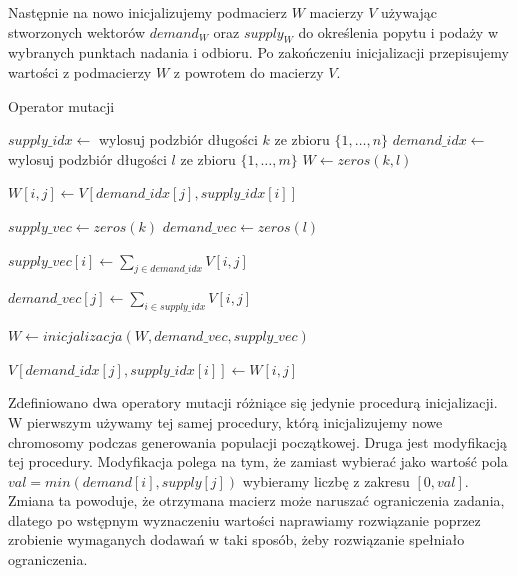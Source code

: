 Następnie na nowo inicjalizujemy podmacierz $W$ macierzy $V$ używając stworzonych wektorów $demand_W$ oraz $supply_W$ do określenia popytu i podaży
w wybranych punktach nadania i odbioru. Po zakończeniu inicjalizacji przepisujemy wartości z podmacierzy $W$ z powrotem do macierzy $V$.

\begin{pseudokod}
    \caption{Operator mutacji}
    
    $supply\_idx \gets$ wylosuj podzbiór długości $k$ ze zbioru $\{1, \dots, n\}$\;
    $demand\_idx \gets$ wylosuj podzbiór długości $l$ ze zbioru $\{1, \dots, m\}$\;
    $W \gets zeros(k, l)$

     {
         {
            $W[i, j] \gets V[demand\_idx[j], supply\_idx[i]]$\;
        }
    }
    
    $supply\_vec \gets zeros(k)$
    $demand\_vec \gets zeros(l)$
    
     {
        $supply\_vec[i] \gets \sum_{j \in demand\_idx} V[i, j]$\;
    }
        
     {
        $demand\_vec[j] \gets \sum_{i \in supply\_idx} V[i, j]$\;
    }
    
    $W \gets inicjalizacja(W, demand\_vec, supply\_vec)$\;
    
     {
         {
            $V[demand\_idx[j], supply\_idx[i]] \gets W[i, j]$\;
        }
    }
    
\end{pseudokod}

Zdefiniowano dwa operatory mutacji różniące się jedynie procedurą inicjalizacji. W pierwszym używamy tej samej procedury, którą inicjalizujemy 
nowe chromosomy podczas generowania populacji początkowej. Druga jest modyfikacją tej procedury. Modyfikacja polega na tym, że zamiast wybierać 
jako wartość pola $val = min(demand[i], supply[j])$ wybieramy liczbę z zakresu $[0, val]$. Zmiana ta powoduje, że otrzymana macierz może naruszać 
ograniczenia zadania, dlatego po wstępnym wyznaczeniu wartości naprawiamy rozwiązanie poprzez zrobienie wymaganych dodawań w taki sposób, żeby 
rozwiązanie spełniało ograniczenia.

